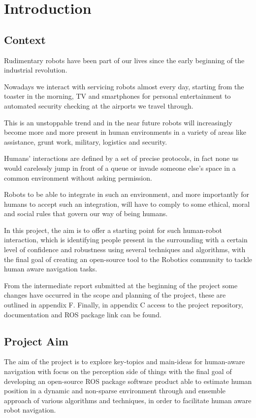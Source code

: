 \chapter{Introduction}
\label{chapter1}

\section{Context}

Rudimentary robots have been part of our lives since the early beginning of the industrial revolution. 

Nowadays we interact with servicing robots almost every day, starting from the toaster in the morning, TV and smartphones for personal entertainment to automated security checking at the airports we travel through. 

This is an unstoppable trend and in the near future robots will increasingly become more and more present in human environments in a variety of areas like assistance, grunt work, military, logistics and security.

Humans' interactions are defined by a set of precise protocols, in fact none us would carelessly jump in front of a queue or invade someone else's space in a common environment without asking permission.

Robots to be able to integrate in such an environment, and more importantly for humans to accept such an integration, will have to comply to some ethical, moral and social rules that govern our way of being humans.

In this project, the aim is to offer a starting point for such human-robot interaction, which is identifying people present in the surrounding with a certain level of confidence and robustness using several techniques and algorithms, with the final goal of creating an open-source tool to the Robotics community to tackle human aware navigation tasks.

From the intermediate report submitted at the beginning of the project some changes have occurred in the scope and planning of the project, these are outlined in appendix F. Finally, in appendix C access to the project repository, documentation and ROS package link can be found.

\section{Project Aim}

The aim of the project is to explore key-topics and main-ideas for human-aware navigation with focus on the perception side of things with the final goal of developing an open-source ROS package software product able to estimate human position in a dynamic and non-sparse environment through and ensemble approach of various algorithms and techniques, in order to facilitate human aware robot navigation.

